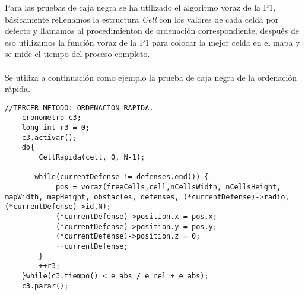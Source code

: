 Para las pruebas de caja negra se ha utilizado el algoritmo voraz de la P1, básicamente rellenamos la estructura \textit{Cell} con los valores de cada celda por defecto y llamamos al procedimienton de ordenación correspondiente, después de eso utilizamos la función voraz de la P1 para colocar la mejor celda en el mapa y se mide el tiempo del proceso completo.
\\\\
Se utiliza a continuación como ejemplo la prueba de caja negra de la ordenación rápida.
\begin{lstlisting}
//TERCER METODO: ORDENACION RAPIDA.
    cronometro c3;
    long int r3 = 0;
    c3.activar();
    do{
        CellRapida(cell, 0, N-1);

       while(currentDefense != defenses.end()) {
            pos = voraz(freeCells,cell,nCellsWidth, nCellsHeight, mapWidth, mapHeight, obstacles, defenses, (*currentDefense)->radio,(*currentDefense)->id,N);
            (*currentDefense)->position.x = pos.x;
            (*currentDefense)->position.y = pos.y;
            (*currentDefense)->position.z = 0; 
            ++currentDefense;
        }	 
        ++r3;
    }while(c3.tiempo() < e_abs / e_rel + e_abs);
    c3.parar();
\end{lstlisting}